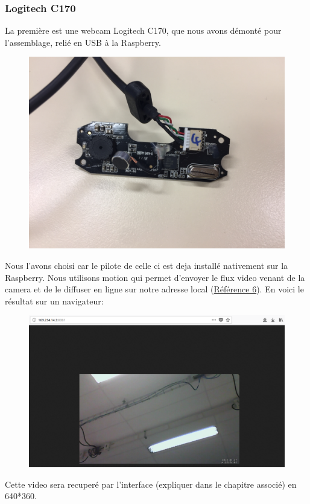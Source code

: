 \documentclass[a4paper,11pt]{report}
\begin{document}
				\subsubsection{Logitech C170}
					La première est une webcam Logitech C170, que nous avons démonté pour l'assemblage, relié en USB à la Raspberry. 
					\begin{figure}[!h]
					\begin{center}
						\includegraphics[scale=0.1]{Photos/Camera11.jpg}
					\end{center}
				\end{figure}
				\newline Nous l'avons choisi car le pilote de celle ci est deja installé nativement sur la Raspberry. Nous utilisons motion qui permet d'envoyer le flux video venant de la camera et de le diffuser en ligne sur notre adresse local (\href{http://169.254.14.03:8081/}{Référence 6}). En voici le résultat sur un navigateur:
				\begin{figure}[!h]
					\begin{center}
						\includegraphics[scale=0.4]{Photos/Camera1.png}
					\end{center}
				\end{figure}
				\newline Cette video sera recuperé par l'interface (expliquer dans le chapitre associé) en 640*360.
				
\end{document}
